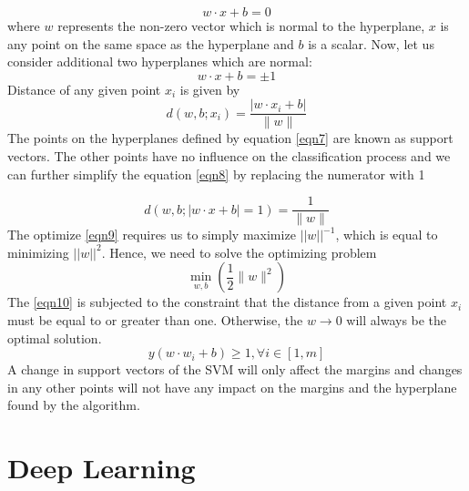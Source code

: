 \begin{equation} \label{eqn6}
   w \cdot x + b = 0
\end{equation}
where $w$ represents the non-zero vector which is normal to the hyperplane, $x$ is any point on the same space as the hyperplane and $b$ is a scalar. Now, let us consider additional two hyperplanes which are normal:
\begin{equation} \label{eqn7}
    w \cdot x + b = \pm 1
\end{equation}
Distance of any given point $x_i$ is given by 
\begin{equation} \label{eqn8}
    d \left( w , b ; x _ { i } \right) = \frac { \left| w \cdot x _ { i } + b \right| } { \| w \| }
\end{equation}
The points on the hyperplanes defined by equation \ref{eqn7} are known as support vectors. The other points have no influence on the classification process and we can further simplify the equation \ref{eqn8} by replacing the numerator with 1

\begin{equation} \label{eqn9}
    d ( w , b ; | w \cdot x + b | = 1 ) = \frac { 1 } { \| w \| }
\end{equation}
The optimize \ref{eqn9} requires us to simply maximize $| | w | | ^ { - 1 }$, which is equal to minimizing $| | w | | ^ { 2 }$. Hence, we need to solve the optimizing problem
\begin{equation} \label{eqn10}
    \min _ { w , b } \left( \frac { 1 } { 2 } \| w \| ^ { 2 } \right)
\end{equation}
The \ref{eqn10} is subjected to the constraint that the distance from a given point $x_i$ must be equal to or greater than one. Otherwise, the $w \rightarrow 0$ will always be the optimal solution. 
\begin{equation} \label{eqn11}
    y \left( w \cdot w _ { i } + b \right) \geq 1 , \forall i \in [ 1 , m ]
\end{equation}
A change in support vectors of the \gls{SVM} will only affect the margins and changes in any other points will not have any impact on the margins and the hyperplane found by the algorithm.

\section{Deep Learning} \label{sec:DeepLearning}

